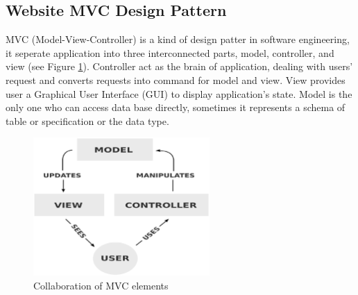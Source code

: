 \subsection{Website MVC Design Pattern}
MVC (Model-View-Controller) is a kind of design patter in software engineering, it seperate application into three interconnected parts, model, controller, and view \cite{Leff2001} (see Figure \ref{fig:mvc}).
Controller act as the brain of application, dealing with users' request and converts requests into command for model and view.
View provides user a Graphical User Interface (GUI) to display application's state.
Model is the only one who can access data base directly, sometimes it represents a schema of table or specification or the data type.

\begin{figure}[H]
    \centering
    \includegraphics[width = 0.6\textwidth]{fig/mvc-relation.eps}
    \caption{Collaboration of MVC elements}
    \label{fig:mvc}
\end{figure}

